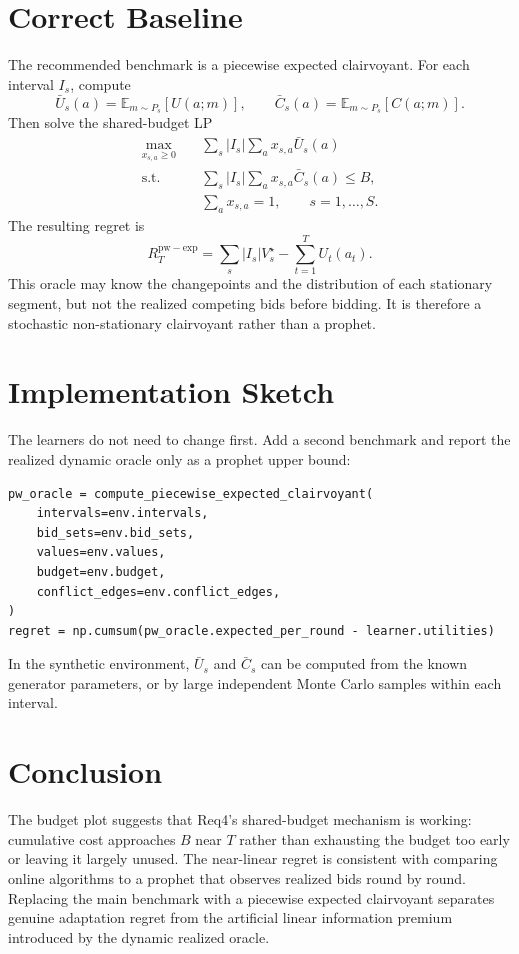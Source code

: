 \documentclass[10pt,a4paper]{article}
\newcommand{\E}{\mathbb{E}}
\newcommand{\1}{\mathbf{1}}
\begin{document}
\section{Correct Baseline}
The recommended benchmark is a piecewise expected clairvoyant. For each interval $I_s$, compute
\[
  \bar U_s(a)=\E_{m\sim P_s}[U(a;m)],\qquad
  \bar C_s(a)=\E_{m\sim P_s}[C(a;m)].
\]
Then solve the shared-budget LP
\[
\begin{aligned}
  \max_{x_{s,a}\ge0}\quad
  &\sum_s |I_s|\sum_a x_{s,a}\bar U_s(a)\\
  \text{s.t.}\quad
  &\sum_s |I_s|\sum_a x_{s,a}\bar C_s(a)\le B,\\
  &\sum_a x_{s,a}=1,\qquad s=1,\ldots,S .
\end{aligned}
\]
The resulting regret is
\[
  R_T^{\mathrm{pw-exp}}
  =
  \sum_s |I_s|V_s^\star
  -
  \sum_{t=1}^T U_t(a_t).
\]
This oracle may know the changepoints and the distribution of each stationary segment, but not the realized competing bids before bidding. It is therefore a stochastic non-stationary clairvoyant rather than a prophet.

\section{Implementation Sketch}
The learners do not need to change first. Add a second benchmark and report the realized dynamic oracle only as a prophet upper bound:
\begin{lstlisting}[style=pythoncompact]
pw_oracle = compute_piecewise_expected_clairvoyant(
    intervals=env.intervals,
    bid_sets=env.bid_sets,
    values=env.values,
    budget=env.budget,
    conflict_edges=env.conflict_edges,
)
regret = np.cumsum(pw_oracle.expected_per_round - learner.utilities)
\end{lstlisting}
In the synthetic environment, $\bar U_s$ and $\bar C_s$ can be computed from the known generator parameters, or by large independent Monte Carlo samples within each interval.

\section{Conclusion}
The budget plot suggests that Req4's shared-budget mechanism is working: cumulative cost approaches $B$ near $T$ rather than exhausting the budget too early or leaving it largely unused. The near-linear regret is consistent with comparing online algorithms to a prophet that observes realized bids round by round. Replacing the main benchmark with a piecewise expected clairvoyant separates genuine adaptation regret from the artificial linear information premium introduced by the dynamic realized oracle.
\end{document}
